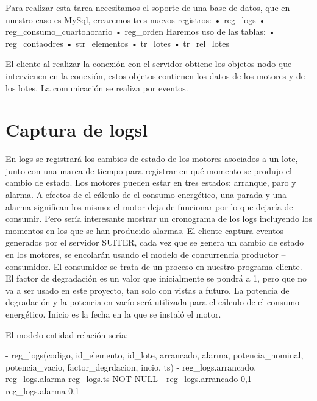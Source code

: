 Para realizar esta tarea necesitamos el soporte de una base de datos,
 que en nuestro caso es MySql, crearemos tres nuevos registros:
•	reg_logs
•	reg_consumo_cuartohorario
•	reg_orden
Haremos uso de las tablas:
•	reg_contaodres
•	str_elementos
•	tr_lotes
•	tr_rel_lotes

El cliente al realizar la conexión con el servidor obtiene los objetos nodo que intervienen en la 
conexión, estos objetos contienen los datos de los motores y de los lotes. La comunicación se 
realiza por eventos.

\section*{Captura de logsl}

En logs se registrará los cambios de estado de los motores asociados a un lote, junto con 
una marca de tiempo para registrar en qué momento se produjo el cambio de estado. Los motores
 pueden estar en tres estados: arranque, paro y alarma. A efectos de el cálculo de el consumo
 energético, una parada y una alarma significan los mismo: el motor deja de funcionar por lo que 
dejaría de consumir. Pero sería interesante mostrar un cronograma de los logs incluyendo los 
momentos en los que se han producido alarmas. El cliente captura eventos generados por el
servidor SUITER, cada vez que se genera un cambio de estado en los motores, se encolarán
 usando el modelo de concurrencia productor – consumidor. El consumidor se trata de un proceso
 en nuestro programa cliente. El factor de degradación es un valor que inicialmente se pondrá
 a 1, pero que no va a ser usado en este proyecto, tan solo con vistas a futuro. La potencia 
de degradación y la potencia en vacío será utilizada para el cálculo de el consumo energético. 
Inicio es la fecha en la que se instaló el motor.

El modelo entidad relación sería:

-	reg_logs(codigo, id_elemento, id_lote, arrancado, alarma, potencia_nominal, potencia_vacio, factor_degrdacion, incio, ts)
-	reg_logs.arrancado. reg_logs.alarma reg_logs.ts NOT NULL
-	reg_logs.arrancado {0,1}
-	reg_logs.alarma {0,1}





